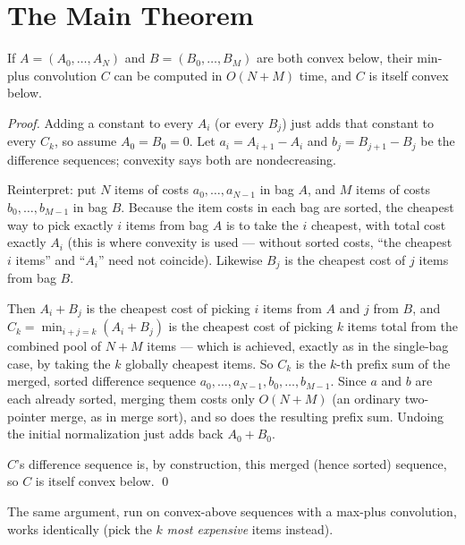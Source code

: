 \documentclass[11pt]{article}
\begin{document}
\section{The Main Theorem}
\begin{theorembox}
If $A=(A_0,\ldots,A_N)$ and $B=(B_0,\ldots,B_M)$ are both convex below,
their min-plus convolution $C$ can be computed in $O(N+M)$ time, and $C$
is itself convex below.

\emph{Proof.} Adding a constant to every $A_i$ (or every $B_j$) just adds
that constant to every $C_k$, so assume $A_0=B_0=0$. Let $a_i = A_{i+1} -
A_i$ and $b_j = B_{j+1}-B_j$ be the difference sequences; convexity says
both are nondecreasing.

Reinterpret: put $N$ items of costs $a_0,\ldots,a_{N-1}$ in bag $A$, and
$M$ items of costs $b_0,\ldots,b_{M-1}$ in bag $B$. Because the item
costs in each bag are sorted, the cheapest way to pick exactly $i$ items
from bag $A$ is to take the $i$ cheapest, with total cost exactly $A_i$
(this is where convexity is used --- without sorted costs, ``the cheapest
$i$ items'' and ``$A_i$'' need not coincide). Likewise $B_j$ is the
cheapest cost of $j$ items from bag $B$.

Then $A_i + B_j$ is the cheapest cost of picking $i$ items from $A$ and
$j$ from $B$, and $C_k=\min_{i+j=k}(A_i+B_j)$ is the cheapest cost of
picking $k$ items total from the combined pool of $N+M$ items --- which
is achieved, exactly as in the single-bag case, by taking the $k$
globally cheapest items. So $C_k$ is the $k$-th prefix sum of the
merged, sorted difference sequence $a_0,\ldots,a_{N-1},b_0,\ldots,b_{M-1}$.
Since $a$ and $b$ are each already sorted, merging them costs only
$O(N+M)$ (an ordinary two-pointer merge, as in merge sort), and so does
the resulting prefix sum. Undoing the initial normalization just adds
back $A_0+B_0$.

$C$'s difference sequence is, by construction, this merged (hence
sorted) sequence, so $C$ is itself convex below. \qed
\end{theorembox}

\begin{notebox}
The same argument, run on convex-above sequences with a max-plus
convolution, works identically (pick the $k$ \emph{most expensive} items
instead).
\end{notebox}
\end{document}
